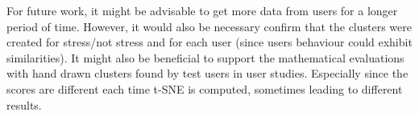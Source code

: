 For future work, it might be advisable to get more data from users for a longer period of time. However, it would also be necessary confirm that the clusters were created for stress/not stress and for each user (since users behaviour could exhibit similarities). It might also be beneficial to support the mathematical evaluations with hand drawn clusters found by test users in user studies. Especially since the scores are different each time t-SNE is computed, sometimes leading to different results.





 









%
%
%












